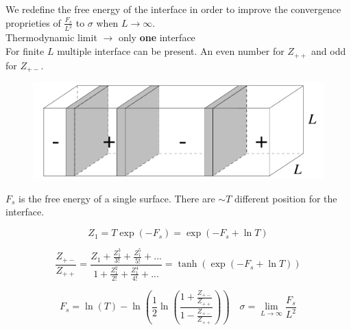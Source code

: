 \documentclass[12pt,handout]{beamer}
\begin{document}
\begin{frame}
\begin{center}
We redefine the free energy of the interface in order to improve the convergence proprieties of $\frac{F_s}{L^2}$ to $\sigma$ when $L \rightarrow \infty$.\\
\vspace{10pt}
Thermodynamic limit {\Large $\rightarrow$} only \textbf{one} interface\\
For finite $L$ multiple interface can be present. An even number for $Z_{++}$ and odd for $Z_{+-}$.\\

\begin{figure}[!htb]
\centering
\includegraphics[scale=0.3]{multiple.png}
\end{figure}

\end{center}
\end{frame}

\begin{frame}
\begin{center}

$F_s$ is the free energy of a single surface. There are $\sim T$ different position for the interface.

\[Z_1 = T \exp \left( - F_s \right) = \exp \left( -F_s +\ln T \right) \]

\[ \frac{Z_{+-}}{Z_{++}} = \frac{Z_1 + \frac{Z_1^3}{3!} + \frac{Z_1^5}{5!} + ...}{1 +  \frac{Z_1^2}{2!} + \frac{Z_1^4}{4!} + ...} = \tanh \left( \exp \left( -F_s +\ln T \right) \right) \]

\[
F_s = \ln \left( T \right) - \ln \left( \frac{1}{2} \ln \left( \frac{1 + \frac{Z_{+-}}{Z_{++}}}{1 - \frac{Z_{+-}}{Z_{++}}} \right) \right) \quad \sigma = \lim_{L \rightarrow \infty} \frac{F_s}{L^2} \]

\end{center}
\end{frame}
\end{document}
